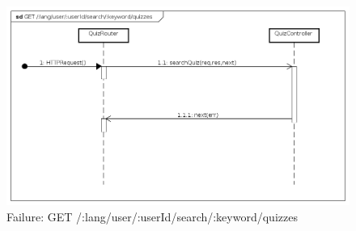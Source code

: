 \begin{itemize}
\begin{figure}[ht]
	\centering
	\includegraphics[scale=0.45]{UML/DiagrammiDiSequenza/Back-end/GET__lang_user__userId_search__keyword_quizzes_failure.png}
	\caption{Failure: GET /:lang/user/:userId/search/:keyword/quizzes}
\end{figure}
\FloatBarrier
\end{itemize}







